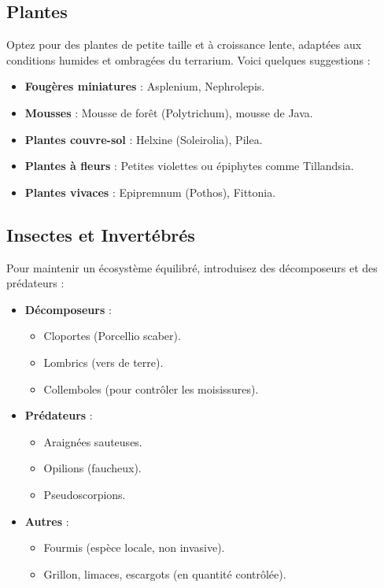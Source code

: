 \subsection*{Plantes}
Optez pour des plantes de petite taille et à croissance lente, adaptées aux conditions humides et ombragées du terrarium. Voici quelques suggestions :

\begin{itemize}
    \item \textbf{Fougères miniatures} : Asplenium, Nephrolepis.
    \item \textbf{Mousses} : Mousse de forêt (Polytrichum), mousse de Java.
    \item \textbf{Plantes couvre-sol} : Helxine (Soleirolia), Pilea.
    \item \textbf{Plantes à fleurs} : Petites violettes ou épiphytes comme Tillandsia.
    \item \textbf{Plantes vivaces} : Epipremnum (Pothos), Fittonia.
\end{itemize}

\subsection*{Insectes et Invertébrés}
Pour maintenir un écosystème équilibré, introduisez des décomposeurs et des prédateurs :

\begin{itemize}
    \item \textbf{Décomposeurs} :
    \begin{itemize}
        \item Cloportes (Porcellio scaber).
        \item Lombrics (vers de terre).
        \item Collemboles (pour contrôler les moisissures).
    \end{itemize}
    \item \textbf{Prédateurs} :
    \begin{itemize}
        \item Araignées sauteuses.
        \item Opilions (faucheux).
        \item Pseudoscorpions.
    \end{itemize}
    \item \textbf{Autres} :
    \begin{itemize}
        \item Fourmis (espèce locale, non invasive).
        \item Grillon, limaces, escargots (en quantité contrôlée).
    \end{itemize}
\end{itemize}

